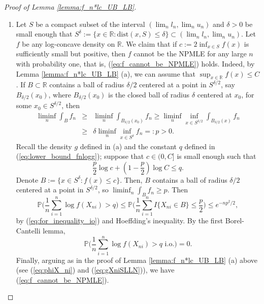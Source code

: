 \documentclass[12pt,letterpaper, twoside, openany]{article}
\theoremstyle{plain}
\begin{document}
\begin{proof}[Proof of Lemma \ref{lemma:f_n*lc_UB_LB}]
\begin{enumerate}
	\item [(b)]
	Let $S$ be a compact subset of the interval $(\lim_n l_n, \lim_n u_n)$ and $\delta > 0$ be small enough that $S^{\delta} := \{x \in \mathbb{R}: \text{dist}(x, S) \leq \delta \} \subset (\lim_n l_n, \lim_n u_n)$.
	Let $f$ be any log-concave density on $\mathbb{R}$. We claim that if $c := 2\inf_{x \in S} f(x)$ is sufficiently small but positive, then $f$ cannot be the NPMLE for any large $n$ with  probability one, that is, (\ref{eq:f_cannot_be_NPMLE}) holds. Indeed, by Lemma \ref{lemma:f_n*lc_UB_LB} (a), we can assume that $\sup_{x \in \mathbb{R}} f(x) \leq C$.
	If $B \subset \mathbb{R}$ contains a ball of radius $\delta/2$ centered at a point in $S^{\delta/2}$, say $B_{\delta/2}(x_0)$, where $B_{\delta/2}(x_0)$ is the closed ball of radius $\delta$ centered at $x_0$, for some $x_0 \in S^{\delta/2}$, then
	\begin{eqnarray*}
		\liminf_n \int_B f_n &\geq &\liminf_n \int_{B_{\delta/2}(x_0)} f_n \geq \liminf_n  \inf_{x \in S^{\delta/2}} \int_{B_{\delta/2}(x)} f_n \\
		&\geq & \delta \liminf_n  \inf_{x \in S^\delta}f_n =: p > 0.
	\end{eqnarray*}
	Recall the density $g$ defined in (a) and the constant $q$ defined in (\ref{eq:lower_bound_fnlogg}); suppose that $c \in (0, C]$ is small enough such that
	\begin{equation}\label{eq:for_inequality_io}
		\frac{p}{2}\log c + \left(1 - \frac{p}{2}\right) \log C \leq q.
	\end{equation}
	Denote $B := \{x \in S^\delta : f(x) \leq c \}$. Then, $B$ contains a ball of radius $\delta/2$ centered at a point in $S^{\delta/2}$, so $\liminf_n \int_B f_n \geq p$. Then 
	\begin{equation*}
		\mathbb{P}\bigg( \frac{1}{n} \sum^n_{i=1} \log f (X_{ni})> q \bigg) \leq \mathbb{P} \bigg( \frac{1}{n}\sum^n_{i=1} I\{X_{ni} \in B \} \leq \frac{p}{2} \bigg) \leq e^{-np^2/2},
	\end{equation*}
	by (\ref{eq:for_inequality_io}) and Hoeffding's inequality. By the first Borel-Cantelli lemma,
	\begin{equation*}
		\mathbb{P} \bigg( \frac{1}{n} \sum^n_{i=1} \log f(X_{ni}) > q \text{ i.o.} \bigg) = 0.
	\end{equation*}
	Finally, arguing as in the proof of Lemma \ref{lemma:f_n*lc_UB_LB} (a) above (see (\ref{eq:phiX_ni}) and (\ref{eq:gXniSLLN})), we have (\ref{eq:f_cannot_be_NPMLE}).
	

\end{enumerate}
\end{proof}
\end{document}
